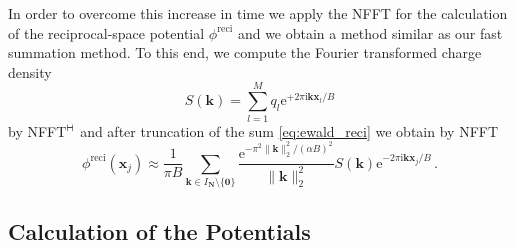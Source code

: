 In order to overcome this increase in time we apply the NFFT for the calculation of the
reciprocal-space potential  $\phi^{\text{reci}}$ and we obtain a method similar as our fast summation method.
To this end, we compute the Fourier transformed charge density
\begin{equation*}
 S(\mathbf k) = \sum_{l=1}^M q_l \text{e}^{+2\pi \text{i} \mathbf k \mathbf x_l/B}
\end{equation*}
by NFFT$^{\vdash \hspace*{-1.72mm} \dashv}$ and after truncation of the sum \eqref{eq:ewald_reci} we obtain by NFFT
\begin{equation*}
 \phi^{\text{reci}}(\mathbf x_j) \approx
 \frac{1}{\pi B} \sum_{\mathbf k\in I_{\mathbf N}\setminus\{\mathbf 0\}}
 \frac{\text{e}^{-\pi^2 \|\mathbf k\|_2^2/(\alpha B)^2}}{\|\mathbf k\|_2^2}
 S(\mathbf k)\text{e}^{-2\pi \text{i} \mathbf k \mathbf x_j/B}\, .
\end{equation*}





\subsection{Calculation of the Potentials}

